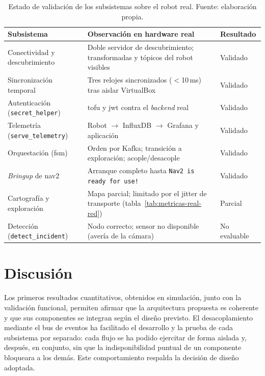 \begin{table}[htbp]
  \centering
  \small
  \caption{Estado de validación de los subsistemas sobre el robot real. Fuente: elaboración
    propia.}
  \label{tab:validacion-real}
  \begin{tabular}{@{}>{\raggedright\arraybackslash}p{4.6cm}
                     >{\raggedright\arraybackslash}p{6.0cm}
                     >{\raggedright\arraybackslash}p{2.6cm}@{}}
    \toprule
    \textbf{Subsistema} & \textbf{Observación en hardware real} & \textbf{Resultado} \\
    \midrule
    Conectividad y descubrimiento & Doble servidor de descubrimiento; transformadas y tópicos
    del robot visibles & Validado \\
    \addlinespace[3pt]
    Sincronización temporal & Tres relojes sincronizados ($<$10\,ms) tras aislar VirtualBox &
    Validado \\
    \addlinespace[3pt]
    Autenticación (\texttt{secret\_helper}) & \gls{tofu} y \gls{jwt} contra el \emph{backend}
    real & Validado \\
    \addlinespace[3pt]
    Telemetría (\texttt{serve\_telemetry}) & Robot $\rightarrow$ InfluxDB $\rightarrow$ Grafana
    y aplicación & Validado \\
    \addlinespace[3pt]
    Orquestación (\gls{fsm}) & Orden por Kafka; transición a exploración; acople/desacople &
    Validado \\
    \addlinespace[3pt]
    \emph{Bringup} de \gls{nav2} & Arranque completo hasta \texttt{Nav2 is ready for use!} &
    Validado \\
    \addlinespace[3pt]
    Cartografía y exploración & Mapa parcial; limitado por el jitter de transporte
    (tabla~\ref{tab:metricas-real-red}) & Parcial \\
    \addlinespace[3pt]
    Detección (\texttt{detect\_incident}) & Nodo correcto; sensor no disponible (avería de la
    cámara) & No evaluable \\
    \bottomrule
  \end{tabular}
\end{table}

\section{Discusión}
\label{sec:discusion}

Los primeros resultados cuantitativos, obtenidos en simulación, junto con la validación
funcional, permiten afirmar que la arquitectura propuesta es coherente y que sus componentes
se integran según el diseño previsto. El desacoplamiento mediante el bus de eventos ha
facilitado el desarrollo y la prueba de cada subsistema por separado: cada flujo se ha podido
ejercitar de forma aislada y, después, en conjunto, sin que la indisponibilidad puntual de un
componente bloqueara a los demás. Este comportamiento respalda la decisión de diseño
adoptada.

